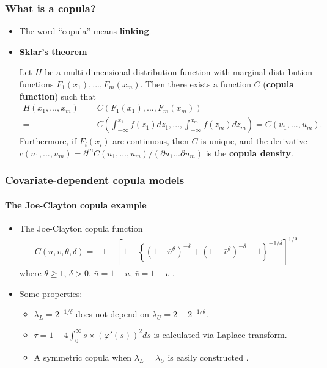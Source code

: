 \documentclass[10pt,aspectratio=43]{beamer}
\begin{document}
\begin{frame}
  \frametitle{What is a copula?}
  \begin{itemize}
  \item The word ``copula'' means \textbf{linking}.
  \item \textbf{Sklar's theorem}

    Let $H$ be a multi-dimensional distribution function with marginal
    distribution functions $F_1(x_1),...,F_m(x_m)$. Then there exists a
    function $C$ (\textbf{copula function}) such that
    \begin{equation*}
      \begin{split}
        H(x_1,...,x_m)= & C(F_1(x_1),...,F_m(x_m))\\
        =&C\left(\int_{-\infty}^{x_1}f(z_1)dz_1,...,\int_{-\infty}^{x_m}f(z_m)dz_m\right)=C(u_1,...,u_m).
      \end{split}
    \end{equation*}
    Furthermore, if $F_i(x_i)$ are continuous, then $C$ is unique, and the derivative $c(u_1,...,u_m)= \partial^m C(u_1,...,u_m)/(\partial u_1...
    \partial u_m)$ is the \textbf{copula density}.

  \end{itemize}
\end{frame}



\begin{frame}
  \frametitle{Covariate-dependent copula models}
  \framesubtitle{The Joe-Clayton copula example}
  \begin{itemize}
  \item The Joe-Clayton copula function \citep{joe1997multivariate}
    \[
    \begin{split}
      C(u,v,\theta,\delta)=&1-\left[1-\left\{\left(1-\bar u ^{\theta }\right)^{-\delta
          }+\left(1-\bar v ^{\theta }\right)^{-\delta }-1\right\}^{-1/\delta
        }\right]^{1/\theta }
    \end{split}
    \]
    where $\theta \geq 1$, $\delta > 0$, $\bar u = 1-u$, $\bar v = 1-v$ .

  \item Some properties:
    \begin{itemize}

    \item $\lambda_L=2^{-1/\delta}$ does not depend on $\lambda_U=2-2^{-1/\theta}$.
    \item  $\tau=1- 4\int _0^{\infty} s\times(\varphi'(s))^2ds$ is calculated via Laplace
      transform.

    \item A symmetric copula when $\lambda_L=\lambda_U$ is easily
      constructed \citep{patton2006modelling}.




    \end{itemize}
  \end{itemize}

\end{frame}
\end{document}
